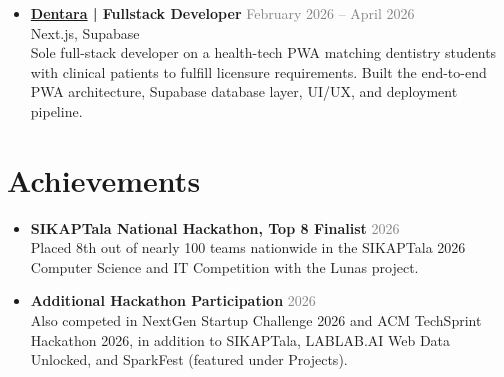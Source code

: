 \documentclass[a4paper,10pt]{article}
\newenvironment{compactlist}
    {
    \begin{itemize}[nosep,after=\strut, leftmargin=1em, itemsep=2pt, label=\textbullet]
    }
    {
    \end{itemize}
    }
\begin{document}
\begin{compactlist}
\item \textbf{\href{https://dentara.vercel.app/}{Dentara} | Fullstack Developer} \hfill \textcolor{gray}{February 2026 -- April 2026} \\
Next.js, Supabase \\
Sole full-stack developer on a health-tech PWA matching dentistry students with clinical patients to fulfill licensure requirements. Built the end-to-end PWA architecture, Supabase database layer, UI/UX, and deployment pipeline.
\end{compactlist}

\section{Achievements}
\begin{compactlist}
\item \textbf{SIKAPTala National Hackathon, Top 8 Finalist} \hfill \textcolor{gray}{2026} \\
Placed 8th out of nearly 100 teams nationwide in the SIKAPTala 2026 Computer Science and IT Competition with the Lunas project.
\item \textbf{Additional Hackathon Participation} \hfill \textcolor{gray}{2026} \\
Also competed in NextGen Startup Challenge 2026 and ACM TechSprint Hackathon 2026, in addition to SIKAPTala, LABLAB.AI Web Data Unlocked, and SparkFest (featured under Projects).
\end{compactlist}

\vfill
{}
\end{document}
